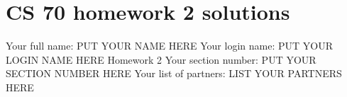 \documentclass[11pt,fleqn]{article}
\begin{document}
\newcommand{\mbf}[1]{\mbox{{\bfseries #1}}}
\newcommand{\N}{\mbf{N}}
\newtheorem{theorem}{Theorem}
\newtheorem{lemma}{Lemma}
\def\floor#1{\lfloor #1 \rfloor}

\section*{CS 70 homework 2 solutions}

Your full name: PUT YOUR NAME HERE
\newline
Your login name: PUT YOUR LOGIN NAME HERE
\newline
Homework 2
\newline
Your section number: PUT YOUR SECTION NUMBER HERE
\newline
Your list of partners: LIST YOUR PARTNERS HERE
\newline
\end{document}
